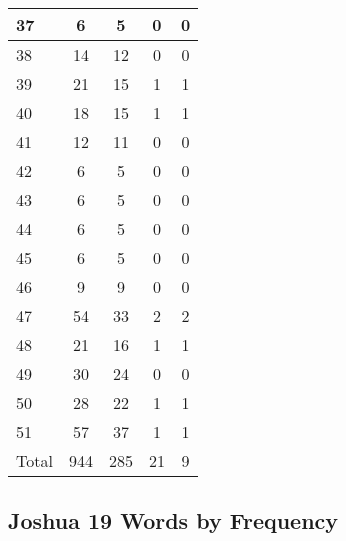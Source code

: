 \begin{center}
\begin{longtable}{l|c|c|c|c}
37 & 6 & 5 & 0 & 0\\ \hline
38 & 14 & 12 & 0 & 0\\ \hline
39 & 21 & 15 & 1 & 1\\ \hline
40 & 18 & 15 & 1 & 1\\ \hline
41 & 12 & 11 & 0 & 0\\ \hline
42 & 6 & 5 & 0 & 0\\ \hline
43 & 6 & 5 & 0 & 0\\ \hline
44 & 6 & 5 & 0 & 0\\ \hline
45 & 6 & 5 & 0 & 0\\ \hline
46 & 9 & 9 & 0 & 0\\ \hline
47 & 54 & 33 & 2 & 2\\ \hline
48 & 21 & 16 & 1 & 1\\ \hline
49 & 30 & 24 & 0 & 0\\ \hline
50 & 28 & 22 & 1 & 1\\ \hline
51 & 57 & 37 & 1 & 1\\ \hline
Total & 944 & 285 & 21 & 9
\end{longtable}
\end{center}





\subsection{Joshua 19 Words by Frequency}


\normalsize
 
